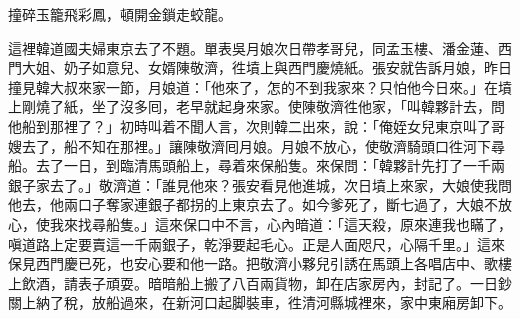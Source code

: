 撞碎玉籠飛彩鳳，頓開金鎖走蛟龍。

這裡韓道國夫婦東京去了不題。單表吳月娘次日帶孝哥兒，同孟玉樓、潘金蓮、西門大姐、奶子如意兒、女婿陳敬濟，徃墳上與西門慶燒紙。張安就告訴月娘，昨日撞見韓大叔來家一節，月娘道：「他來了，怎的不到我家來？只怕他今日來。」在墳上剛燒了紙，坐了沒多囘，老早就起身來家。使陳敬濟徃他家，「叫韓夥計去，問他船到那裡了？」初時叫着不聞人言，次則韓二出來，說：「俺姪女兒東京叫了哥嫂去了，船不知在那裡。」讓陳敬濟囘月娘。月娘不放心，使敬濟騎頭口徃河下尋船。去了一日，到臨清馬頭船上，尋着來保船隻。來保問：「韓夥計先打了一千兩銀子家去了。」敬濟道：「誰見他來？張安看見他進城，次日墳上來家，大娘使我問他去，他兩口子奪家連銀子都拐的上東京去了。如今爹死了，斷七過了，大娘不放心，使我來找尋船隻。」這來保口中不言，心內暗道：「這天殺，原來連我也瞞了，嗔道路上定要賣這一千兩銀子，乾淨要起毛心。正是人面咫尺，心隔千里。」這來保見西門慶已死，也安心要和他一路。把敬濟小夥兒引誘在馬頭上各唱店中、歌樓上飲酒，請表子頑耍。暗暗船上搬了八百兩貨物，卸在店家房內，封記了。一日鈔關上納了稅，放船過來，在新河口起脚裝車，徃清河縣城裡來，家中東廂房卸下。

